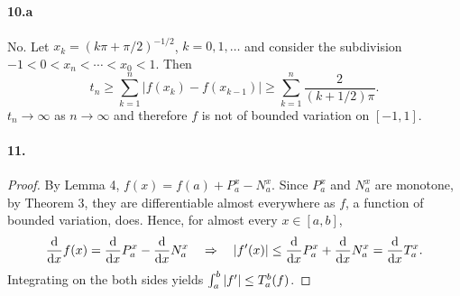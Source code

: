   \paragraph{10.a}
  \begin{solution}
    No. Let $x_k = (k\pi+\pi/2)^{-1/2}$, $k=0,1,\dots$ and consider the 
    subdivision $-1<0<x_n<\cdots<x_0<1$. Then
    \[
      t_n \ge \sum_{k=1}^n|f(x_k)-f(x_{k-1})|
      \ge\sum_{k=1}^n\frac{2}{(k+1/2)\pi}.
    \]
    $t_n\to\infty$ as $n\to\infty$ and therefore $f$ is not of bounded 
    variation on $[-1,1]$.
  \end{solution}

  \paragraph{11.}
  \begin{proof}
    By Lemma 4, $f(x)=f(a)+P_a^x-N_a^x$. Since $P_a^x$ and $N_a^x$ are monotone,
    by Theorem 3, they are differentiable almost everywhere as $f$, a function 
    of bounded variation, does. Hence, for almost every $x\in[a,b]$,
    \[
      \frac{\mathrm{d}}{\mathrm{d} x}f(x) = \frac{\mathrm{d}}{\mathrm{d} x}P_a^x - \frac{\mathrm{d}}{\mathrm{d} x}N_a^x
      \quad\Rightarrow\quad
      |f^\prime(x)| \le \frac{\mathrm{d}}{\mathrm{d} x}P_a^x+\frac{\mathrm{d}}{\mathrm{d} x}N_a^x = 
      \frac{\mathrm{d}}{\mathrm{d} x}T_a^x.
    \]
    Integrating on the both sides yields $\int_a^b|f^\prime|\le T_a^b(f)$.
  \end{proof}


